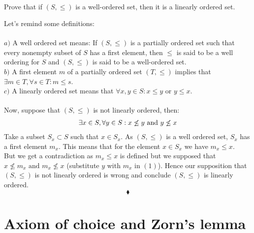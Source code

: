 \subsection{}
\begin{tcolorbox}
Prove that if $(S,\leq)$  is a well-ordered set, then it is a linearly ordered set. 
\end{tcolorbox}
$$ $$
Let's remind some definitions:\\\\
$a)$ A well ordered set means: 
If $(S,\leq )$ is a partially ordered set such that every nonempty subset of $S$ has a first element, then $\leq$ is said to be a well ordering for $S$ and $(S,\leq )$ is said to be a well-ordered set.\\
$b)$ A first element $m$ of a partially ordered set $(T,\leq )$ implies that $\exists m\in T, \forall s\in T: m\leq s$.\\
$c)$ A linearly ordered set means that $\forall x,y\in S: x\leq y\text{ or } y\leq x$. \\\\
Now, suppose that $(S,\leq)$ is not linearly ordered, then:
\begin{align}\exists x\in S, \forall y\in S: x\not \leq y \text{ and } y\not \leq x\end{align}
Take a subset $S_x\subset S$ such that $x\in S_x$. As $(S,\leq)$ is a well ordered set, $S_x$ has a first element $m_x$. This means that for the element $x\in S_x$ we have $m_x\leq x$.\\
But we get a contradiction as $m_x\leq x$ is defined but we  supposed that $x\not \leq m_x\text{ and } m_x\not \leq x$ (substitute $y$ with $m_x$ in $(1)$). Hence our supposition that $(S,\leq)$ is not linearly ordered is wrong and conclude $(S,\leq)$ is linearly ordered. 
$$\blacklozenge$$



\newpage

 \section{Axiom of choice and Zorn's lemma}
